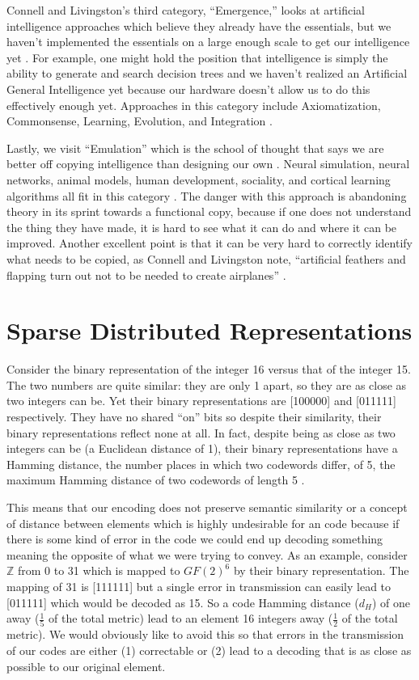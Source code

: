 \documentclass[fleqn,notitlepage,minimal]{article}
\begin{document}
	Connell and Livingston's third category, ``Emergence,'' looks at artificial intelligence approaches which believe they already have the essentials, but we haven't implemented the essentials on a large enough scale to get our intelligence yet \cite{Connell}. For example, one might hold the position that intelligence is simply the ability to generate and search decision trees and we haven't realized an Artificial General Intelligence yet because our hardware doesn't allow us to do this effectively enough yet. Approaches in this category include Axiomatization, Commonsense, Learning, Evolution, and Integration \cite{Connell}.
	
	Lastly, we visit ``Emulation'' which is the school of thought that says we are better off copying intelligence than designing our own \cite{Connell}. Neural simulation, neural networks, animal models, human development, sociality, and cortical learning algorithms all fit in this category \cite{Connell}. The danger with this approach is abandoning theory in its sprint towards a functional copy, because if one does not understand the thing they have made, it is hard to see what it can do and where it can be improved. Another excellent point is that it can be very hard to correctly identify what needs to be copied, as Connell and Livingston note, ``artificial feathers and flapping turn out not to be needed to create airplanes'' \cite{Connell}.
	
	\section{Sparse Distributed Representations}
	
	Consider the binary representation of the integer 16 versus that of the integer 15. The two numbers are quite similar: they are only 1 apart, so they are as close as two integers can be. Yet their binary representations are [100000] and [011111] respectively. They have no shared ``on'' bits so despite their similarity, their binary representations reflect none at all. In fact, despite being as close as two integers can be (a Euclidean distance of 1), their binary representations have a Hamming distance, the number places in which two codewords differ, of 5, the maximum Hamming distance of two codewords of length 5 \cite{Adams}. 
	
	This means that our encoding does not preserve semantic similarity or a concept of distance between elements which is highly undesirable for an code because if there is some kind of error in the code we could end up decoding something meaning the opposite of what we were trying to convey. As an example, consider $\mathbb{Z}$ from 0 to 31 which is mapped to $GF(2)^{6}$ by their binary representation. The mapping of 31 is [111111] but a single error in transmission can easily lead to [011111] which would be decoded as 15. So a code Hamming distance ($d_{H}$) of one away ($\frac{1}{5}$ of the total metric) lead to an element 16 integers away ($\frac{1}{2}$ of the total metric). We would obviously like to avoid this so that errors in the transmission of our codes are either (1) correctable or (2) lead to a decoding that is as close as possible to our original element.
	
\end{document}
